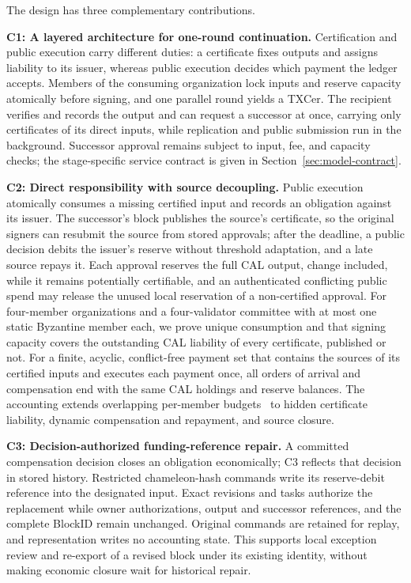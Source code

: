 The design has three complementary contributions.

\noindent\textbf{C1: A layered architecture for one-round continuation.} Certification and public execution carry different duties: a certificate fixes outputs and assigns liability to its issuer, whereas public execution decides which payment the ledger accepts. Members of the consuming organization lock inputs and reserve capacity atomically before signing, and one parallel round yields a TXCer. The recipient verifies and records the output and can request a successor at once, carrying only certificates of its direct inputs, while replication and public submission run in the background. Successor approval remains subject to input, fee, and capacity checks; the stage-specific service contract is given in Section~\ref{sec:model-contract}.

\noindent\textbf{C2: Direct responsibility with source decoupling.} Public execution atomically consumes a missing certified input and records an obligation against its issuer. The successor's block publishes the source's certificate, so the original signers can resubmit the source from stored approvals; after the deadline, a public decision debits the issuer's reserve without threshold adaptation, and a late source repays it. Each approval reserves the full CAL output, change included, while it remains potentially certifiable, and an authenticated conflicting public spend may release the unused local reservation of a non-certified approval. For four-member organizations and a four-validator committee with at most one static Byzantine member each, we prove unique consumption and that signing capacity covers the outstanding CAL liability of every certificate, published or not. For a finite, acyclic, conflict-free payment set that contains the sources of its certified inputs and executes each payment once, all orders of arrival and compensation end with the same CAL holdings and reserve balances. The accounting extends overlapping per-member budgets~\cite{stingray} to hidden certificate liability, dynamic compensation and repayment, and source closure.

\noindent\textbf{C3: Decision-authorized funding-reference repair.} A committed compensation decision closes an obligation economically; C3 reflects that decision in stored history. Restricted chameleon-hash commands write its reserve-debit reference into the designated input. Exact revisions and tasks authorize the replacement while owner authorizations, output and successor references, and the complete BlockID remain unchanged. Original commands are retained for replay, and representation writes no accounting state. This supports local exception review and re-export of a revised block under its existing identity, without making economic closure wait for historical repair.


